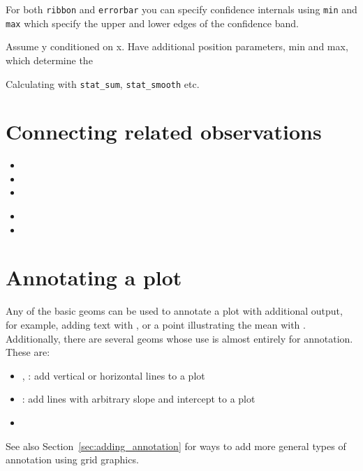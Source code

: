 For both {\tt ribbon} and {\tt errorbar} you can specify confidence internals using {\tt min} and {\tt max} which specify the upper and lower edges of the confidence band.

Assume y conditioned on x.  Have additional position parameters, min and max, which determine the 


Calculating with {\tt stat\_sum}, {\tt stat\_smooth} etc.

\section{Connecting related observations}
\label{sec:connecting}

\begin{itemize}
  \item {}
  \item {}
  \item {}
\end{itemize}

\begin{itemize}
  \item {}
  \item {}
\end{itemize}


\section{Annotating a plot}
\label{sec:annotating}

Any of the basic geoms can be used to annotate a plot with additional output, for example, adding text with , or a point illustrating the mean with .  Additionally, there are several geoms whose use is almost entirely for annotation.  These are:

\begin{itemize}
	\item {}, : add vertical or horizontal lines to a plot
	\item {}: add lines with arbitrary slope and intercept to a plot
	\item {}
\end{itemize}

See also Section~\ref{sec:adding_annotation} for ways to add more general types of annotation using grid graphics.

